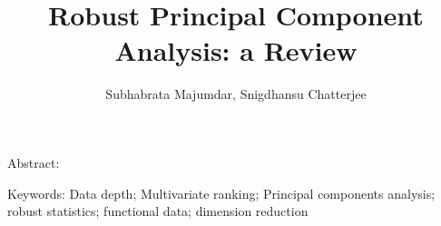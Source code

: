 \documentclass[fleqn,11pt]{article}
\numberwithin{equation}{section}
\begin{document}
\newtheorem{Theorem}{Theorem}[section]
\newtheorem{Lemma}[Theorem]{Lemma}
\newtheorem{Corollary}[Theorem]{Corollary}
\newtheorem{Proposition}[Theorem]{Proposition}
\newtheorem{Conjecture}[Theorem]{Conjecture}
\theoremstyle{definition} \newtheorem{Definition}[Theorem]{Definition}

\title{Robust Principal Component Analysis: a Review}
\date{}
\author{Subhabrata Majumdar, Snigdhansu Chatterjee}
\maketitle

Abstract:
\vspace{.5cm}

Keywords:
Data depth; Multivariate ranking; Principal components analysis; robust statistics; functional data; dimension reduction

\newpage
%





\end{document}
